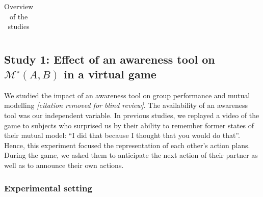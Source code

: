 \documentclass[natbib]{svjour3}
\newcommand{\gModel}[2]{{$\mathcal{M}^{\circ}(#1, #2)$}}
\begin{document}
\begin{table}[ht!]
\begin{tabular}{p{2.1cm}L{1.65cm}L{1.7cm}L{1.8cm}L{1.6cm}L{1.6cm}}
\bottomrule
\end{tabular}
\caption{Overview of the studies}
\label{synthesis_table}
\end{table}



\subsection{{\bf Study 1}: Effect of an awareness tool on \gModel{A}{B} in a virtual
game}

We studied the impact of an awareness tool on group performance and mutual
modelling \textit{[citation removed for blind review]}. The availability of an
awareness tool was our independent variable. In previous studies, we replayed a
video of the game to subjects who surprised us by their ability to remember
former states of their mutual model: ``I did that because I thought that you
would do that''. Hence, this experiment focused the representation of each
other's action plans. During the game, we asked them to anticipate the next
action of their partner as well as to announce their own actions.

\subsubsection*{Experimental setting}
\end{document}
